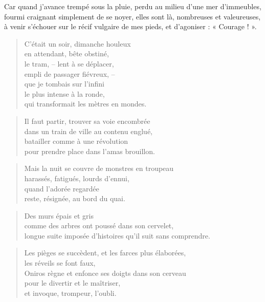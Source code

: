   Car  quand  j'avance  trempé  sous  la   pluie,  perdu  au  milieu  d'une  mer
  d'immeubles,  fourmi  craignant  simplement  de   se  noyer,  elles  sont  là,
  nombreuses et  valeureuses, à venir s'échouer  sur le récif vulgaire  de mes
  pieds, et d'agoniser : « Courage ! ».
  \begin{verse}
    C'était un soir, dimanche houleux\\
    en attendant, bête obstiné,\\
    le tram, – lent à se déplacer,\\
    empli de passager fiévreux, –\\
    que je tombais sur l'infini\\
    le plus intense à la ronde,\\
    qui transformait les mètres en mondes.
  \end{verse}
  \begin{verse}
    Il faut partir, trouver sa voie encombrée\\
    dans un train de ville au contenu englué,\\
    batailler comme à une révolution\\
    pour prendre place dans l'amas brouillon.
  \end{verse}
  \begin{verse}
    Mais la nuit se couvre de monstres en troupeau\\
    harassés, fatigués, lourds d'ennui,\\
    quand l'adorée regardée\\
    reste, résignée, au bord du quai.
  \end{verse}
  \begin{verse}
    Des murs épais et gris\\
    comme des arbres ont poussé dans son cervelet,\\
    longue suite imposée d'histoires qu'il suit sans comprendre.
  \end{verse}
  \begin{verse}
    Les pièges se succèdent, et les farces plus élaborées,\\
    les réveils se font faux,\\
    Oniros règne et enfonce ses doigts dans son cerveau\\
    pour le divertir et le maîtriser,\\
    et invoque, trompeur, l'oubli.
  \end{verse}
